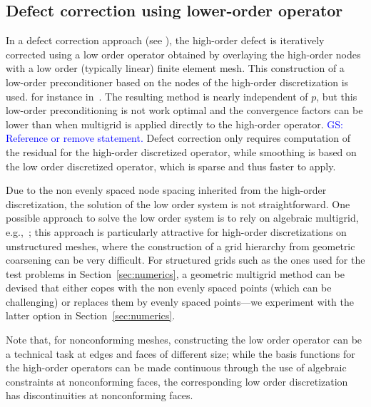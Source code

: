 \documentclass[smallcondensed,final]{svjour3}     %
\newcommand{\gsnote}[1]{\textcolor{blue}{GS: #1}}
\begin{document}
\subsection{Defect correction using lower-order operator}\label{subsec:low}
In a defect correction approach (see
\cite{TrottenbergOosterleeSchuller01, Hackbusch85}), the high-order defect is
iteratively corrected using a low order operator obtained by
overlaying the high-order nodes with a low order (typically linear)
finite element mesh.  This construction of a low-order preconditioner
based on the nodes of the high-order discretization is used. for
instance
in~\cite{Brown10,Kim07,DevilleMund90,HeysManteuffelMcCormickEtAl05}.
The resulting method is nearly independent of $p$, but this low-order
preconditioning is not work optimal and the convergence factors can be
lower than when multigrid is applied directly to the high-order
operator. \gsnote{Reference or remove statement.} Defect correction
only requires computation of the residual for the high-order
discretized operator, while smoothing is based on the low order
discretized operator, which is sparse and thus faster to apply.

Due to the non evenly spaced node spacing inherited from the
high-order discretization, the solution of the low order system is not
straightforward. One possible approach to solve the low order system
is to rely on algebraic multigrid,
e.g.,~\cite{Brown10,HeysManteuffelMcCormickEtAl05}; this approach is
particularly attractive for high-order discretizations on unstructured
meshes, where the construction of a grid hierarchy from geometric
coarsening can be very difficult. For structured grids such as the
ones used for the test problems in Section~\ref{sec:numerics}, a
geometric multigrid method can be devised that either copes with the
non evenly spaced points (which can be challenging) or replaces them
by evenly spaced points---we experiment with the latter option in
Section~\ref{sec:numerics}.

Note that, for nonconforming meshes, constructing the low order
operator can be a technical task at edges and faces of different size;
while the basis functions for the high-order operators can be made
continuous through the use of algebraic constraints at nonconforming
faces, the corresponding low order discretization has discontinuities
at nonconforming faces.



\end{document}
